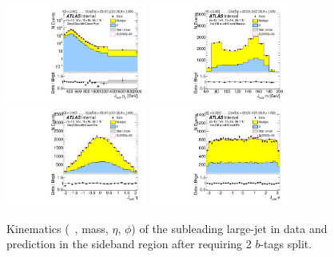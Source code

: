 \begin{figure}[htb!]
\begin{center}
\includegraphics[width=0.41\textwidth,angle=-90]{figures/boosted/Sideband/b77_TwoTag_split_Sideband_sublHCand_Pt_m_1.pdf}
\includegraphics[width=0.41\textwidth,angle=-90]{figures/boosted/Sideband/b77_TwoTag_split_Sideband_sublHCand_Mass_s.pdf}\\
\includegraphics[width=0.41\textwidth,angle=-90]{figures/boosted/Sideband/b77_TwoTag_split_Sideband_sublHCand_Eta.pdf}
\includegraphics[width=0.41\textwidth,angle=-90]{figures/boosted/Sideband/b77_TwoTag_split_Sideband_sublHCand_Phi.pdf}
  \caption{Kinematics (\pt~, mass, $\eta$, $\phi$) of the subleading large-\R jet in data and prediction in the sideband region after requiring 2 $b$-tags split.}
  \label{fig:boosted-2bs-sideband-ak10-subl}
\end{center}
\end{figure}

